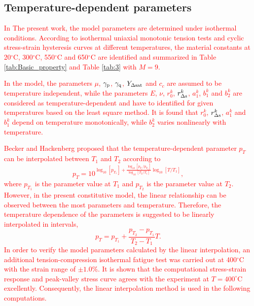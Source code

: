 \documentclass[preprint,5p,twocolumn,11pt,sort&compress]{elsarticle}
\newcommand{\marked}[1]{\textcolor{red}{#1}}
\begin{document}
\subsection{Temperature-dependent parameters}
\noindent
\marked{In The present work, the model parameters are determined under isothermal conditions.
According to isothermal uniaxial monotonic tension tests and  cyclic stress-strain hysteresis curves at different temperatures, the material constants at 20$^{\circ}$C, 300$^{\circ}$C, 550$^{\circ}$C and 650$^{\circ}$C are identified and summarized in Table \ref{tab:Basic_property} and Table \ref{tab:3} with $M=9$. }

\marked{In the model, the parameters $\mu$, $\gamma_{\rm{p}}$, $\gamma_{\rm{q}}$, $Y_{\Delta {\rm{sat}}}$ and $c_c$ are assumed to be temperature independent, while the parameters $E$, $\nu$, $r_0^k$, $r_{\Delta \rm{s}}^k$, $a_1^k$, $b_1^k$ and $b_2^k$ are considered as temperature-dependent and have to identified for given temperatures based on the least square method. It is found that $r_0^k$, $r_{\Delta \rm{s}}^k$, $a_1^k$ and $b_1^k$ depend on temperature monotonically, while $b_2^k$ varies nonlinearly with temperature.}


\marked{Becker and Hackenberg \cite{Becker2011596} proposed that the temperature-dependent parameter $p_T$ can be interpolated between $T_1$ and $T_2$ according to
\[p_T = {10^{{{\log }_{10}}\left[ {{p_{{T_1}}}} \right] + \frac{{{{\log }_{10}}\left[ {{p_{{T_1}}}/{p_{{T_2}}}} \right]}}{{{{\log }_{10}}\left[ {{T_2}/{T_1}} \right]}}{{\log }_{10}}\left[ {T/{T_1}} \right]}},\]
where ${{p_{{T_1}}}}$ is the parameter value at $T_1$ and ${{p_{{T_2}}}}$ is the parameter value at $T_2$.
However, in the present constitutive model, the linear relationship can be observed between the most parameters and temperature. Therefore, the temperature dependence of the parameters is suggested to be linearly interpolated in intervals,
\[{p_T} = {p_{{T_1}}} + \frac{{{p_{{T_2}}} - {p_{{T_1}}}}}{{{T_2} - {T_1}}}{T}.\]
In order to verify the model parameters calculated by the linear interpolation, an additional tension-compression isothermal fatigue test was carried out at 400$^\circ$C with the strain range of $\pm1.0\%$.
It is shown that the computational stress-strain response and peak-valley stress curve  agrees with the experiment at $T=400^\circ$C excellently. Consequently, the linear interpolation method is used in the following computations.}
\end{document}

